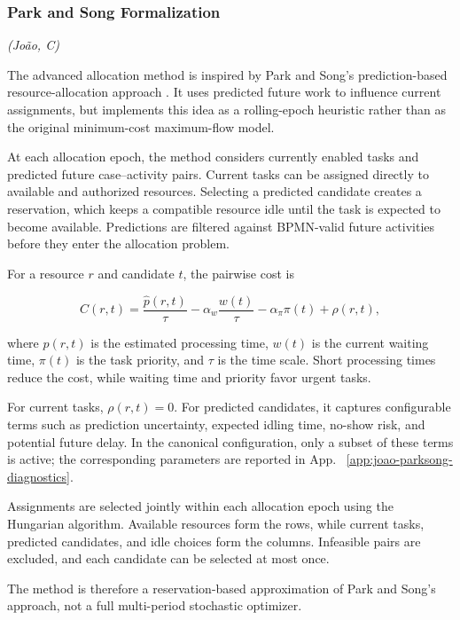 \subsubsection{Park and Song Formalization}
\label{ssub:park}
\textit{(João, C)}\quad

The advanced allocation method is inspired by Park and Song's
prediction-based resource-allocation approach
\cite{park2019predictionbased,park2023predictiveallocation}. It uses predicted
future work to influence current assignments, but implements this idea as a
rolling-epoch heuristic rather than as the original minimum-cost maximum-flow
model.

At each allocation epoch, the method considers currently enabled tasks and
predicted future case--activity pairs. Current tasks can be assigned directly
to available and authorized resources. Selecting a predicted candidate creates
a reservation, which keeps a compatible resource idle until the task is
expected to become available. Predictions are filtered against BPMN-valid
future activities before they enter the allocation problem.

For a resource $r$ and candidate $t$, the pairwise cost is

\[
C(r,t)=
\frac{\hat{p}(r,t)}{\tau}
-\alpha_w\frac{w(t)}{\tau}
-\alpha_\pi\pi(t)
+\rho(r,t),
\]

where $\hat{p}(r,t)$ is the estimated processing time, $w(t)$ is the current
waiting time, $\pi(t)$ is the task priority, and $\tau$ is the time scale.
Short processing times reduce the cost, while waiting time and priority favor
urgent tasks.

For current tasks, $\rho(r,t)=0$. For predicted candidates, it captures configurable terms such as prediction uncertainty, expected idling time,
no-show risk, and potential future delay. In the canonical configuration, only a subset of these terms is active; the
corresponding parameters are reported in App. ~\ref{app:joao-parksong-diagnostics}.

Assignments are selected jointly within each allocation epoch using the
Hungarian algorithm. Available resources form the rows, while current tasks,
predicted candidates, and idle choices form the columns. Infeasible pairs are
excluded, and each candidate can be selected at most once.

The method is therefore a reservation-based approximation of Park and Song's
approach, not a full multi-period stochastic optimizer.